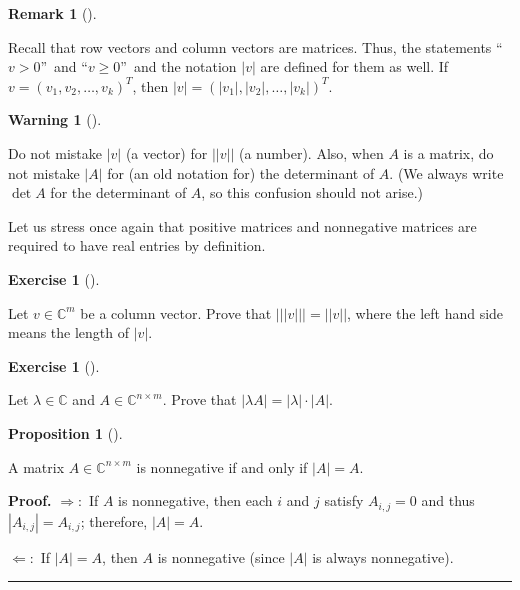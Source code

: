 \documentclass[numbers=enddot,12pt,final,onecolumn,notitlepage]{scrartcl}%
\newcounter{exer}
\numberwithin{exer}{subsection}
\theoremstyle{definition}
\newtheorem{prop}[theo]{Proposition}
\newenvironment{proposition}[1][]
{\begin{prop}[#1]\begin{leftbar}}
{\end{leftbar}\end{prop}}
\newtheorem{remk}[theo]{Remark}
\newenvironment{remark}[1][]
{\begin{remk}[#1]\begin{leftbar}}
{\end{leftbar}\end{remk}}
\newtheorem{warn}[theo]{Warning}
\newenvironment{warning}[1][]
{\begin{warn}[#1]\begin{leftbar}}
{\end{leftbar}\end{warn}}
\newtheorem{exmp}[exer]{Exercise}
\newenvironment{exercise}[1][]
{\begin{exmp}[#1]\begin{leftbar}}
{\end{leftbar}\end{exmp}}
\newenvironment{proof}[1][Proof]{\noindent\textbf{#1.} }{\ \rule{0.5em}{0.5em}}
\newenvironment{warning}[1][Warning]{\noindent\textbf{#1.} }{\ \rule{0.5em}{0.5em}}
\begin{document}
\begin{remark}
Recall that row vectors and column vectors are matrices. Thus, the statements
\textquotedblleft$v>0$\textquotedblright\ and \textquotedblleft$v\geq
0$\textquotedblright\ and the notation $\left\vert v\right\vert $ are defined
for them as well. If $v=\left(  v_{1},v_{2},\ldots,v_{k}\right)  ^{T}$, then
$\left\vert v\right\vert =\left(  \left\vert v_{1}\right\vert ,\left\vert
v_{2}\right\vert ,\ldots,\left\vert v_{k}\right\vert \right)  ^{T}$.
\end{remark}

\begin{warning}
Do not mistake $\left\vert v\right\vert $ (a vector) for $\left\vert
\left\vert v\right\vert \right\vert $ (a number). Also, when $A$ is a matrix,
do not mistake $\left\vert A\right\vert $ for (an old notation for) the
determinant of $A$. (We always write $\det A$ for the determinant of $A$, so
this confusion should not arise.)
\end{warning}

Let us stress once again that positive matrices and nonnegative matrices are
required to have real entries by definition.

\begin{exercise}
 Let $v\in\mathbb{C}^{m}$ be a column vector. Prove that $\left\vert
\left\vert \left\vert v\right\vert \right\vert \right\vert =\left\vert
\left\vert v\right\vert \right\vert $, where the left hand side means the
length of $\left\vert v\right\vert $.
\end{exercise}

\begin{exercise}
\label{exe.posmat.abs-lamA} Let $\lambda\in\mathbb{C}$ and
$A\in\mathbb{C}^{n\times m}$. Prove that $\left\vert \lambda A\right\vert
=\left\vert \lambda\right\vert \cdot\left\vert A\right\vert $.
\end{exercise}

\begin{proposition}
A matrix $A\in\mathbb{C}^{n\times m}$ is nonnegative if and only if
$\left\vert A\right\vert =A$.
\end{proposition}

\begin{proof}
$\Longrightarrow:$ If $A$ is nonnegative, then each $i$ and $j$ satisfy
$A_{i,j}=0$ and thus $\left\vert A_{i,j}\right\vert =A_{i,j}$; therefore,
$\left\vert A\right\vert =A$.

$\Longleftarrow:$ If $\left\vert A\right\vert =A$, then $A$ is nonnegative
(since $\left\vert A\right\vert $ is always nonnegative).
\end{proof}
\end{document}
